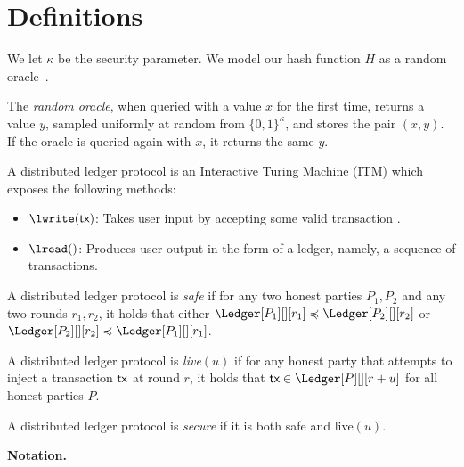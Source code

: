 \section{Definitions}



We let $\kappa$ be the security parameter.
We model our hash function $H$ as a random oracle~\cite{ro}.

\begin{definition}
  The \emph{random oracle}, when queried with a value $x$ for the first time,
  returns a value $y$, sampled uniformly at random from $\{0, 1\}^\kappa$,
  and stores the pair $(x, y)$. If the oracle
  is queried again with $x$, it returns the same $y$.
\end{definition}

\begin{definition}
  A distributed ledger protocol is an Interactive Turing Machine (ITM)
  which exposes the following methods:

  \begin{itemize}
    \item $\lwrite(\tx)$:
          Takes user input by accepting some valid transaction \tx.
    \item $\lread()$:
          Produces user output in the form of a ledger, namely, a
          sequence of transactions.
  \end{itemize}
\end{definition}


\begin{definition}[Safety]
  A distributed ledger protocol is \emph{safe} if
  for any two honest parties $P_1, P_2$ and any two rounds $r_1, r_2$, it holds that either
  $\Ledger[P_1][][r_1] \preccurlyeq \Ledger[P_2][][r_2]$ or $\Ledger[P_2][][r_2] \preccurlyeq \Ledger[P_1][][r_1]$.
\end{definition}

\begin{definition}[Liveness]
  A distributed ledger protocol is \emph{live}$(u)$ if
  for any honest party that attempts to inject a transaction $\textsf{tx}$
  at round $r$, it holds that $\tx \in \Ledger[P][][r+u]$
  for all honest parties $P$.
\end{definition}

\begin{definition}[Secure]
  A distributed ledger protocol is \emph{secure} if it is
  both safe and live$(u)$.
\end{definition}

\textbf{Notation.}

